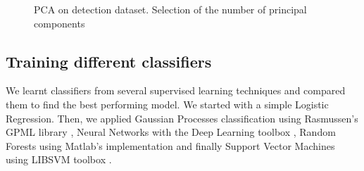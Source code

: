 \documentclass[10pt,a4paper]{article}
\begin{document}
   \begin{figure}[ht]
       \center
    	\hfill
	\caption{PCA on detection dataset. Selection of the number of principal components}
  \end{figure}

  \subsection{Training different classifiers}
  We learnt classifiers from several supervised learning techniques and compared them to find the best performing model. We started with a simple Logistic Regression. Then, we applied Gaussian Processes classification using Rasmussen's GPML library \cite{gpmltoolbox},  Neural Networks with the Deep Learning toolbox \cite{deeplearningtoolbox}, Random Forests using Matlab's implementation and finally Support Vector Machines using LIBSVM toolbox \cite{libsvmtoolbox}.\\
\end{document}
